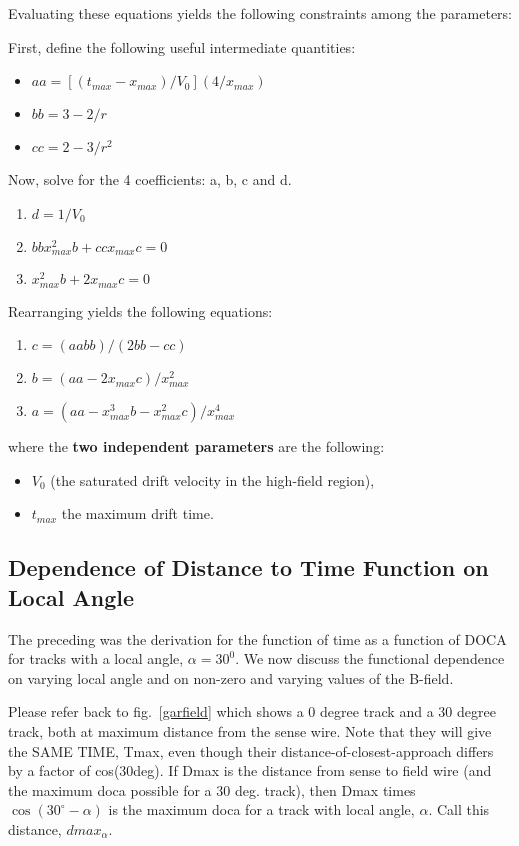 \documentclass{article}
\begin{document}
Evaluating these equations
yields the following constraints among the parameters:

First, define the following useful intermediate quantities:
\begin{itemize}
\item $aa = [(t_{max} - x_{max}) / V_0] (4/x_{max})$
\item $bb = 3 - 2/r$
\item $cc = 2 - 3/r^2$
\end{itemize}

Now, solve for the 4 coefficients: a, b, c and d.
\begin{enumerate}
\item $d = 1/V_0$
\item $bb x_{max}^2 b + cc x_{max} c = 0$
\item $   x_{max}^2 b +  2 x_{max} c = 0$
\end{enumerate}

Rearranging yields the following equations:
\begin{enumerate}
\item $c = (aa bb) / (2 bb - cc)    $
\item $b = (aa-2 x_{max} c) / x_{max}^2 $
\item $a = (aa - x_{max}^3 b - x_{max}^2 c) / x_{max}^4 $
\end{enumerate}

where the {\bf two   independent parameters} are the following:
\begin{itemize}
\item {\bf $V_0$} (the saturated drift velocity in the high-field region), 
\item {\bf $t_{max}$} the maximum drift time.
\end{itemize}


\subsection{Dependence of Distance to Time Function on Local Angle}
\noindent
The preceding was the derivation for the function of time as a function
of DOCA for tracks with a local angle, $\alpha = 30^0$.  We now discuss the
functional dependence on varying local angle and on non-zero and varying
values of the B-field.

Please refer back to fig.~\ref{garfield} which shows a 0 degree track and a 30 degree
track, both at maximum distance from the sense wire.  Note that they will give the
SAME TIME, Tmax, even though their distance-of-closest-approach differs by a factor
of cos(30deg).  If Dmax is the distance from sense to field wire (and the maximum
doca possible for a 30 deg. track), then Dmax times $\cos(30^\circ-\alpha)$ is the maximum
doca for a track with local angle, $\alpha$.  Call this distance, $dmax_{\alpha}$.
\end{document}
